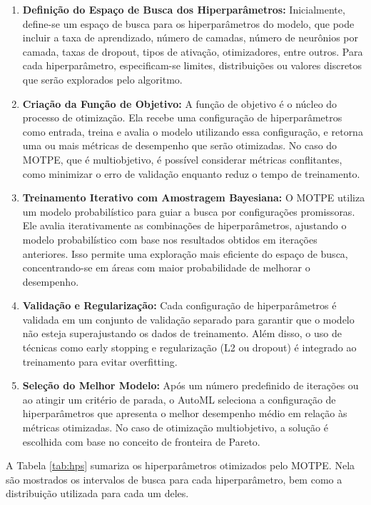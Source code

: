 \begin{enumerate}
  \item \textbf{Definição do Espaço de Busca dos Hiperparâmetros:}
        Inicialmente, define-se um espaço de busca para os hiperparâmetros do modelo, que pode incluir a taxa de aprendizado, número de camadas, número de neurônios por camada, taxas de dropout, tipos de ativação, otimizadores, entre outros. Para cada hiperparâmetro, especificam-se limites, distribuições ou valores discretos que serão explorados pelo algoritmo.

  \item \textbf{Criação da Função de Objetivo:}
        A função de objetivo é o núcleo do processo de otimização. Ela recebe uma configuração de hiperparâmetros como entrada, treina e avalia o modelo utilizando essa configuração, e retorna uma ou mais métricas de desempenho que serão otimizadas. No caso do MOTPE, que é multiobjetivo, é possível considerar métricas conflitantes, como minimizar o erro de validação enquanto reduz o tempo de treinamento.

  \item \textbf{Treinamento Iterativo com Amostragem Bayesiana:}
        O MOTPE utiliza um modelo probabilístico para guiar a busca por configurações promissoras. Ele avalia iterativamente as combinações de hiperparâmetros, ajustando o modelo probabilístico com base nos resultados obtidos em iterações anteriores. Isso permite uma exploração mais eficiente do espaço de busca, concentrando-se em áreas com maior probabilidade de melhorar o desempenho.

  \item \textbf{Validação e Regularização:}
        Cada configuração de hiperparâmetros é validada em um conjunto de validação separado para garantir que o modelo não esteja superajustando os dados de treinamento. Além disso, o uso de técnicas como early stopping e regularização (L2 ou dropout) é integrado ao treinamento para evitar overfitting.

  \item \textbf{Seleção do Melhor Modelo:}
        Após um número predefinido de iterações ou ao atingir um critério de parada, o AutoML seleciona a configuração de hiperparâmetros que apresenta o melhor desempenho médio em relação às métricas otimizadas. No caso de otimização multiobjetivo, a solução é escolhida com base no conceito de fronteira de Pareto.
\end{enumerate}

A Tabela \ref{tab:hps} sumariza os hiperparâmetros otimizados pelo MOTPE. Nela são mostrados os intervalos de busca para cada hiperparâmetro, bem como a distribuição utilizada para cada um deles.


